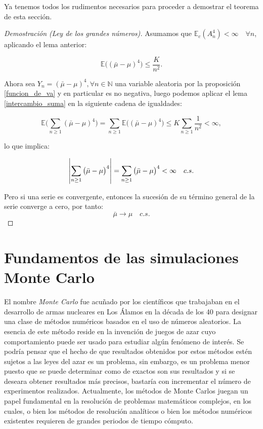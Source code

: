 \documentclass[../proyecto.tex]{memoir}
\begin{document}
Ya tenemos todos los rudimentos necesarios para proceder a demostrar el teorema de esta sección.

\begin{proof}[Demostración (Ley de los grandes números)]

Asumamos que $\mathds{E}_c( A_n^4) < \infty \quad \forall n$, aplicando el lema anterior:

$$
	\mathds{E} \big( ( \bar{ \mu } - \mu ) ^ 4 \big) \leq \frac{K}{n^{2}}.
$$

Ahora sea $Y_n = ( \bar{ \mu } - \mu ) ^ 4, \forall n \in \mathds{N}$ una variable aleatoria por la proposición \ref{funcion_de_va} y en particular es no negativa, luego podemos aplicar el lema \ref{intercambio_suma} en la siguiente cadena de igualdades:

$$
	\mathds{E} \big( \sum_{n \geq 1}( \bar{ \mu } - \mu ) ^ 4 \big) = \sum_{n \geq 1} \mathds{E} \big( ( \bar{ \mu } - \mu ) ^ 4 \big)  \leq K\sum_{n \geq 1}\frac{1}{n^{2}} < \infty,
$$

lo que implica:

$$
\abs{ \sum_{n \geq 1} \big( \bar{ \mu } - \mu \big)^ 4 } = \sum_{n \geq 1} \big( \bar{ \mu } - \mu \big)^ 4 < \infty \quad c.s. 
$$

Pero si una serie es convergente, entonces la sucesión de su término general de la serie converge a cero, por tanto:
$$
 \bar{ \mu } \to \mu \quad c.s.
$$
\end{proof}


\section{Fundamentos de las simulaciones Monte Carlo} \label{MonteCarlo}

El nombre \textit{Monte Carlo} fue acuñado por los científicos que trabajaban en el desarrollo de armas nucleares en Los Álamos en la década de los 40 para designar una clase de métodos numéricos basados en el uso de números aleatorios. La esencia de este método reside en la invención de juegos de azar cuyo comportamiento puede ser usado para estudiar algún fenómeno de interés. Se podría pensar que el hecho de que resultados obtenidos por estos métodos estén sujetos a las leyes del azar es un problema, sin embargo, es un problema menor puesto que se puede determinar como de exactos son sus resultados y si se deseara obtener resultados más precisos, bastaría con incrementar el número de experimentos realizados. Actualmente, los métodos de Monte Carlos juegan un papel fundamental en la resolución de problemas matemáticos complejos, en los cuales, o bien los métodos de resolución analíticos o bien los métodos numéricos existentes requieren de grandes periodos de tiempo cómputo.
\end{document}

